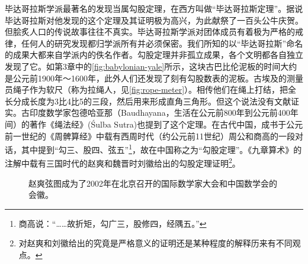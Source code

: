 \documentclass[b5paper]{ctexart}
\begin{document}
毕达哥拉斯学派最著名的发现当属勾股定理，在西方叫做“毕达哥拉斯定理”。据说毕达哥拉斯对他发现的这个定理及其证明极为高兴，为此献祭了一百头公牛庆贺。但脍炙人口的传说故事往往不真实。毕达哥拉斯学派对团体成员有着极为严格的戒律，任何人的研究发现都归学派所有并必须保密。我们所知的以“毕达哥拉斯”命名的成果大都来自学派内的佚名作者。勾股定理并非孤立成果，各个文明都各自独立发现了它。如第3章中的\cref{fig:babylonian-yale}所示，这块古巴比伦泥板的时间大约是公元前1900年～1600年，此外人们还发现了刻有勾股数表的泥板。古埃及的测量员绳子作为软尺（称为拉绳人，见\cref{fig:rope-meter}）。相传他们在绳上打结，把全长分成长度为3比4比5的三段，然后用来形成直角三角形。但这个说法没有文献证实。古印度数学家包德哈亚那（Baudhayana，生活在公元前800年到公元前400年间）的著作《绳法经》(Śulba Sutra)也提到了这个定理。在古代中国，成书于公元前一世纪的《周髀算经》中载有西周时代（约公元前11世纪）周公和商高的一段对话，其中提到“勾三、股四、弦五”\footnote{商高说：“……故折矩，勾广三，股修四，经隅五。”}，故在中国称之为“勾股定理”。《九章算术》的注解中载有三国时代的赵爽和魏晋时刘徽给出的勾股定理证明\footnote{对赵爽和刘徽给出的究竟是严格意义的证明还是某种程度的解释历来有不同观点。}。

\begin{figure}[htbp]
 \centering
  \quad
 \caption{赵爽弦图成为了2002年在北京召开的国际数学家大会和中国数学会的会徽。\label{fig:cms-zhaoshuang}}
\end{figure}
\end{document}

